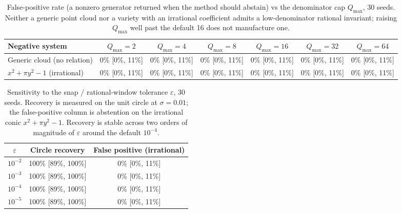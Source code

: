 \documentclass{article}
\begin{document}
\begin{table}[ht]
\centering
\caption{False-positive rate (a nonzero generator returned when the method should abstain) vs the denominator cap $Q_{\max}$, 30 seeds. Neither a generic point cloud nor a variety with an irrational coefficient admits a low-denominator rational invariant; raising $Q_{\max}$ well past the default 16 does not manufacture one.}
\label{tab:qmax-falsepos}
\begin{tabular}{l cccccc}
\toprule
\textbf{Negative system} & $Q_{\max}{=}2$ & $Q_{\max}{=}4$ & $Q_{\max}{=}8$ & $Q_{\max}{=}16$ & $Q_{\max}{=}32$ & $Q_{\max}{=}64$ \\
\midrule
Generic cloud (no relation) & 0\% [0\%, 11\%] & 0\% [0\%, 11\%] & 0\% [0\%, 11\%] & 0\% [0\%, 11\%] & 0\% [0\%, 11\%] & 0\% [0\%, 11\%] \\
$x^2+\pi y^2-1$ (irrational) & 0\% [0\%, 11\%] & 0\% [0\%, 11\%] & 0\% [0\%, 11\%] & 0\% [0\%, 11\%] & 0\% [0\%, 11\%] & 0\% [0\%, 11\%] \\
\bottomrule
\end{tabular}
\end{table}


\begin{table}[ht]
\centering
\caption{Sensitivity to the snap / rational-window tolerance $\varepsilon$, 30 seeds. Recovery is measured on the unit circle at $\sigma=0.01$; the false-positive column is abstention on the irrational conic $x^2+\pi y^2-1$. Recovery is stable across two orders of magnitude of $\varepsilon$ around the default $10^{-4}$.}
\label{tab:eps-sensitivity}
\begin{tabular}{c c c}
\toprule
$\varepsilon$ & \textbf{Circle recovery} & \textbf{False positive (irrational)} \\
\midrule
$10^{-2}$ & 100\% [89\%, 100\%] & 0\% [0\%, 11\%] \\
$10^{-3}$ & 100\% [89\%, 100\%] & 0\% [0\%, 11\%] \\
$10^{-4}$ & 100\% [89\%, 100\%] & 0\% [0\%, 11\%] \\
$10^{-5}$ & 100\% [89\%, 100\%] & 0\% [0\%, 11\%] \\
\bottomrule
\end{tabular}
\end{table}
\end{document}
